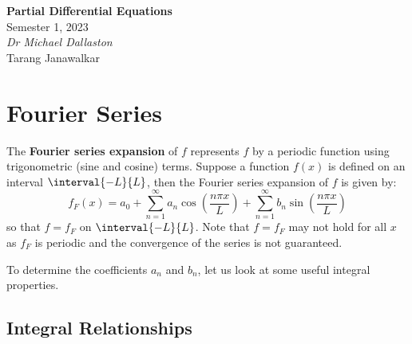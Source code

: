 \documentclass{article}
\date{}
\newcommand{\unitName}{Partial Differential Equations}
\newcommand{\unitTime}{Semester 1, 2023}
\newcommand{\unitCoordinator}{Dr Michael Dallaston}
\newcommand{\documentAuthors}{Tarang Janawalkar}
\begin{document}
%
\begin{titlepage}
    \vspace*{\fill}
    \begin{center}
        \LARGE{\textbf{\unitName}} \\[0.1in]
        \normalsize{\unitTime} \\[0.2in]
        \normalsize\textit{\unitCoordinator} \\[0.2in]
        \documentAuthors
    \end{center}
    \vspace*{\fill}
    \doclicenseThis
    \thispagestyle{empty}
\end{titlepage}
\newpage
%
\tableofcontents
\newpage
%
\section{Fourier Series}
\begin{definition}
    The \textbf{Fourier series expansion} of \(f\) represents \(f\) by a periodic function using trigonometric (sine and cosine) terms.
    Suppose a function \(f\left( x \right)\) is defined on an interval
    \(\interval{-L}{L}\), then the Fourier series expansion of \(f\) is
    given by:
    \begin{equation}
        \label{eq:fourier}
        f_F\left( x \right) = a_0 + \sum_{n = 1}^\infty a_n \cos{\left( \frac{n \pi x}{L} \right)} + \sum_{n = 1}^\infty b_n \sin{\left( \frac{n \pi x}{L} \right)}
    \end{equation}
    so that \(f = f_F\) on \(\interval{-L}{L}\). Note that \(f = f_F\) may not hold for all \(x\) as \(f_F\) is periodic and the convergence of the series is not guaranteed.
\end{definition}
To determine the coefficients \(a_n\) and \(b_n\), let us look at some useful integral properties.
\subsection{Integral Relationships}
\end{document}

